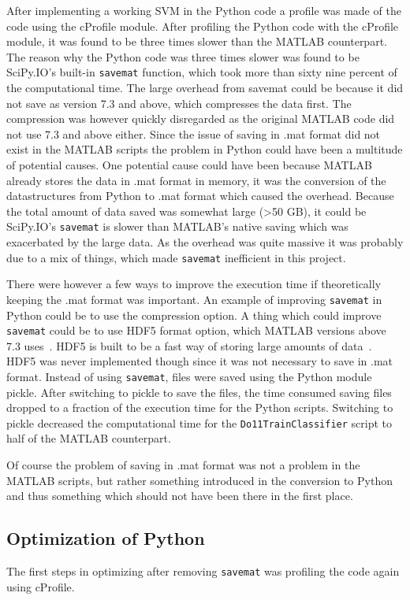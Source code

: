 \documentclass[12pt, a4paper]{article}
\begin{document}
After implementing a working SVM in the Python code a profile was made of the code using the cProfile module.
After profiling the Python code with the cProfile module, it was found to be three times slower than the MATLAB counterpart.
The reason why the Python code was three times slower was found to be SciPy.IO's built-in \texttt{savemat} function, which took more than sixty nine percent of the computational time.
The large overhead from savemat could be because it did not save as version 7.3 and above, which compresses the data first.
The compression was however quickly disregarded as the original MATLAB code did not use 7.3 and above either.
Since the issue of saving in .mat format did not exist in the MATLAB scripts the problem in Python could have been a multitude of potential causes.
One potential cause could have been because MATLAB already stores the data in .mat format in memory, it was the conversion of the datastructures from Python to .mat format which caused the overhead.
Because the total amount of data saved was somewhat large (>50 GB), it could be SciPy.IO's \texttt{savemat} is slower than MATLAB's native saving which was exacerbated by the large data. 
As the overhead was quite massive it was probably due to a mix of things, which made \texttt{savemat} inefficient in this project.

There were however a few ways to improve the execution time if theoretically keeping the .mat format was important.
An example of improving \texttt{savemat} in Python could be to use the compression option.
A thing which could improve \texttt{savemat} could be to use HDF5 format option, which MATLAB versions above 7.3 uses~\cite{Mat73HDF5}.
HDF5 is built to be a fast way of storing large amounts of data~\cite{WhatIsHDF5}.
HDF5 was never implemented though since it was not necessary to save in .mat format.
Instead of using \texttt{savemat}, files were saved using the Python module pickle.
After switching to pickle to save the files, the time consumed saving files dropped to a fraction of the execution time for the Python scripts.
Switching to pickle decreased the computational time for the \texttt{Do11TrainClassifier} script to half of the MATLAB counterpart. %

Of course the problem of saving in .mat format was not a problem in the MATLAB scripts, but rather something introduced in the conversion to Python and thus something which should not have been there in the first place.

\subsection{Optimization of Python}
The first steps in optimizing after removing \texttt{savemat} was profiling the code again using cProfile.
\end{document}
